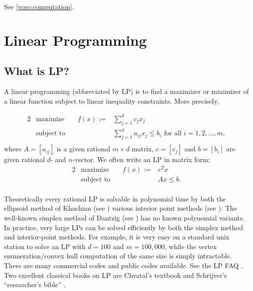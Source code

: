 \documentclass[a4paper,12pt]{article}
\begin{document}
See  \ref{voro:computation}.


\section{Linear Programming} \label{Sec:LP}

\subsection{What is LP?} \label{LP:def}

A linear programming (abbreviated by LP) is to find a maximizer or
minimizer of a linear function subject to linear inequality constraints.
More precisely, 

\begin{alignat}{2}
&\text{maximize}  
  & \quad f(x) :=  & \sum_{j=1}^d c_j x_j   \label{eq:LP} \\
&\text{subject to}  
  &                & \sum_{j=1}^{d}  a_{ij} x_j \le b_i \text{ for all }  i=1,2,\ldots, m, \\  \nonumber
\end{alignat}
where $A=[a_{ij}]$ is a given rational $m\times d$ matrix, 
$c=[c_j] $ and $b=[b_i]$ are given rational $d$- and $n$-vector.
We often write an LP in matrix form:
\begin{alignat}{2}
&\text{maximize} 
  & \quad f(x) :=  & c^T x   \label{eq:LPmat} \\
&\text{subject to}  
  &                        & A  x \le b. \\  \nonumber
\end{alignat}

Theoretically every rational
LP is solvable in polynomial time by both the ellipsoid method of Khachian
(see \cite{k-palp-79,s-tlip-86})
various interior point methods (see \cite{k-nptal-84,rtv-talpip-97}).
The well-known simplex method of Dantzig (see \cite{d-lpe-63,c-lp-83})
has no known polynomial variants.  In practice,
very large LPs can be solved efficiently 
by both the simplex method and interior-point
methods.  
For example, it is very easy on a standard unix station to solve an LP with
$d=100$ and $m=100,000$, while the vertex enumeration/convex hull
computation of the same size is simply intractable.
There are many commercial codes and public codes available.
See the LP FAQ \cite{fg-lpfaq}.  Two excellent classical books on LP are
Chvatal's textbook \cite{c-lp-83} and Schrijver's 
``researcher's bible'' \cite{s-tlip-86}.
\end{document}
